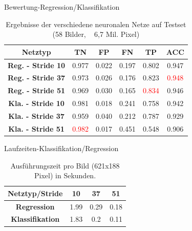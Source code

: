 \begin{frame}{Bewertung-Regression/Klassifikation}

      
      \begin{table}[h!]
  \begin{center}
    \label{tab:table1}
    \begin{tabular}{c|ccccc}
    \toprule
      \textbf{Netztyp} & \textbf{TN} & \textbf{FP} & \textbf{FN} & \textbf{TP} & \textbf{ACC} \\
       \midrule
      \textbf{Reg. - Stride 10} & 0.977 & 0.022 & 0.197 & 0.802 & 0.947\\
      \textbf{Reg. - Stride 37} & 0.973 & 0.026 & 0.176 & 0.823 &  \textcolor{red}{0.948}\\ 
      \textbf{Reg. - Stride 51} & 0.969 & 0.030 & 0.165 & \textcolor{red}{0.834} & 0.946\\
      \midrule
      \textbf{Kla. - Stride 10} & 0.981 & 0.018 & 0.241 & 0.758 & 0.942\\
      \textbf{Kla. - Stride 37} & 0.959 & 0.040 & 0.212 & 0.787 & 0.929\\
      \textbf{Kla. - Stride 51} & \textcolor{red}{0.982} & 0.017 & 0.451 & 0.548 & 0.906\\
      \bottomrule
    \end{tabular}
    \caption{Ergebnisse der verschiedene neuronalen Netze auf Testset (58 Bilder, ~ 6,7 Mil. Pixel)}
  \end{center}
\end{table}

\end{frame}

\begin{frame}{Laufzeiten-Klassifikation/Regression}

            \begin{table}[h!]
  \begin{center}

    \begin{tabular}{c|ccc}
    \toprule
      \textbf{Netztyp/Stride} & \textbf{10} & \textbf{37} & \textbf{51} \\
     \midrule
      \textbf{Regression} & 1.99 & 0.29 & 0.18 \\
      \textbf{Klassifikation} & 1.83 & 0.2 & 0.11\\
      \bottomrule
    \end{tabular}
        \caption{Ausf\"uhrungszeit pro Bild (621x188 Pixel) in Sekunden.}
  \end{center}
\end{table}

\end{frame}

